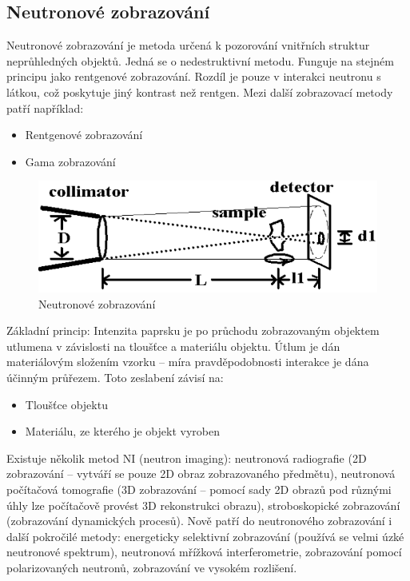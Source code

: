 \subsection{Neutronové zobrazování}

Neutronové zobrazování je metoda určená k pozorování vnitřních struktur neprůhledných objektů. Jedná se o nedestruktivní metodu. Funguje na stejném principu jako rentgenové zobrazování. Rozdíl je pouze v interakci neutronu s látkou, což poskytuje jiný kontrast než rentgen. Mezi další zobrazovací metody patří například:

\begin{itemize}
    \item Rentgenové zobrazování
    \item Gama zobrazování
\end{itemize}

\begin{figure}[H]
    \centering
    \includegraphics[width=0.7\linewidth]{img/SestavanaNZ.png}
    \caption{Neutronové zobrazování}
    \label{fig:enter-label}
\end{figure}

Základní princip: Intenzita paprsku je po průchodu zobrazovaným objektem utlumena v závislosti na tloušťce a materiálu objektu. Útlum je dán materiálovým složením vzorku -- míra pravděpodobnosti interakce je dána účinným průřezem. Toto zeslabení závisí na:

\begin{itemize}
    \item Tloušťce objektu
    \item Materiálu, ze kterého je objekt vyroben
\end{itemize}

Existuje několik metod NI (neutron imaging): neutronová radiografie (2D zobrazování -- vytváří se pouze 2D obraz zobrazovaného předmětu), neutronová počítačová tomografie (3D zobrazování -- pomocí sady 2D obrazů pod různými úhly lze počítačově provést 3D rekonstrukci obrazu), stroboskopické zobrazování (zobrazování dynamických procesů). Nově patří do neutronového zobrazování i další pokročilé metody: energeticky selektivní zobrazování (používá se velmi úzké neutronové spektrum), neutronová mřížková interferometrie, zobrazování pomocí polarizovaných neutronů, zobrazování ve vysokém rozlišení.


